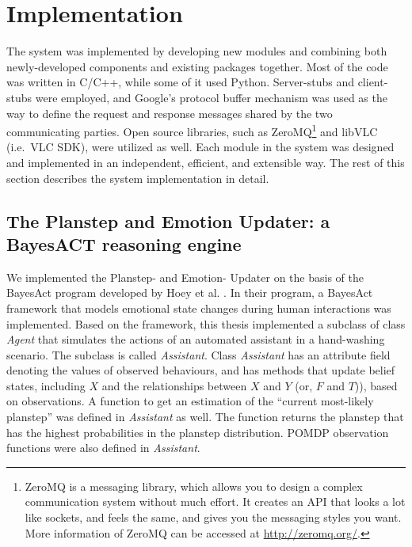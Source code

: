 \chapter{Implementation}
\label{chap:impl}

The system was implemented by developing new modules and combining both newly-developed components and existing packages together. Most of the code was written in C/C++, while some of it used Python. Server-stubs and client-stubs were employed, and Google's protocol buffer mechanism was used as the way to define the request and response messages shared by the two communicating parties. Open source libraries, such as ZeroMQ\footnote{ZeroMQ is a messaging library, which allows you to design a complex communication system without much effort. It creates an API that looks a lot like sockets, and feels the same, and gives you the messaging styles you want. More information of ZeroMQ can be accessed at \url{http://zeromq.org/}.} and libVLC (i.e.~VLC SDK), were utilized as well. Each module in the system was designed and implemented in an independent, efficient, and extensible way. The rest of this section describes the system implementation in detail.

\section{The Planstep and Emotion Updater: a BayesACT reasoning engine}

We implemented the Planstep- and Emotion- Updater on the basis of the BayesAct program developed by Hoey et al. \cite{hoey2013bayesian}. In their program, a BayesAct framework that models emotional state changes during human interactions was implemented. Based on the framework, this thesis implemented a subclass of class \textit{Agent} that simulates the actions of an automated assistant in a hand-washing scenario. The subclass is called \textit{Assistant}. Class \textit{Assistant} has an attribute field denoting the values of observed behaviours, and has methods that update belief states, including $X$ and the relationships between $X$ and $Y$ (or, $F$ and $T$)), based on observations. A function to get an estimation of the ``current most-likely planstep'' was defined in \textit{Assistant} as well. The function returns the planstep that has the highest probabilities in the planstep distribution. POMDP observation functions were also defined in \textit{Assistant}. 

